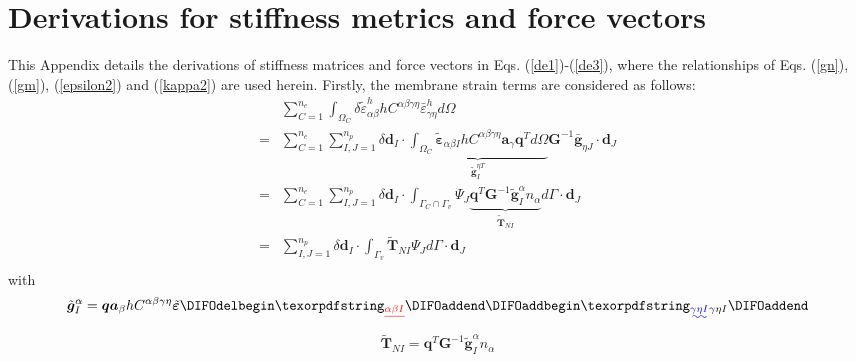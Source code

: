 \section{Derivations for stiffness metrics and force vectors}\label{derivations}
This Appendix details the derivations of stiffness matrices and force vectors in Eqs. (\ref{de1})-(\ref{de3}), where the relationships of Eqs. (\ref{gn}), (\ref{gm}), (\ref{epsilon2}) and (\ref{kappa2}) are used herein. Firstly, the membrane strain terms are considered as follows:
\begin{equation}
\begin{split}
&\sum_{C=1}^{n_e}\int_{\Omega_C} \delta \tilde \varepsilon_{\alpha\beta}^h hC^{\alpha\beta\gamma\eta}\bar \varepsilon^h_{\gamma\eta} d\Omega \\
        =&\sum_{C=1}^{n_e}\sum_{I,J=1}^{n_p}\delta \boldsymbol d_I \cdot \underbrace{\int_{\Omega_C} \tilde{\boldsymbol \varepsilon}_{\alpha\beta I} hC^{\alpha\beta\gamma\eta} \boldsymbol a_\gamma \boldsymbol q^T d\Omega}_{\tilde{\boldsymbol g}^{\eta T}_I} \boldsymbol G^{-1} \bar{\boldsymbol g}_{\eta J} \cdot \boldsymbol d_J \\
        =&\sum_{C=1}^{n_e}\sum_{I,J=1}^{n_p}\delta \boldsymbol d_I \cdot \int_{\Gamma_C\cap\Gamma_v} \Psi_J \underbrace{\boldsymbol q^T \boldsymbol G^{-1}\tilde{\boldsymbol g}^\alpha_I
        n_\alpha}_{\tilde{\boldsymbol T}_{NI}} d\Gamma
       \cdot \boldsymbol d_J \\
        =&\sum_{I,J=1}^{n_p}\delta \boldsymbol d_I \cdot \int_{\Gamma_v} \tilde{\boldsymbol T}_{NI}\Psi_J d\Gamma
       \cdot \boldsymbol d_J \\
\end{split}
\end{equation}
with
\begin{equation}
        \tilde{\boldsymbol g}^\alpha_I = \boldsymbol q \boldsymbol a_\beta hC^{\alpha\beta\gamma\eta} \tilde{\boldsymbol \varepsilon}\DIFdelbegin \DIFdel{_{\alpha\beta I}
}\DIFdelend \DIFaddbegin \DIFadd{_{\gamma\eta I}
}\DIFaddend \end{equation}
\begin{equation}
        \tilde{\boldsymbol T}_{NI} = \boldsymbol q^T \boldsymbol G^{-1} \tilde{\boldsymbol g}_I^\alpha n_\alpha
\end{equation}


